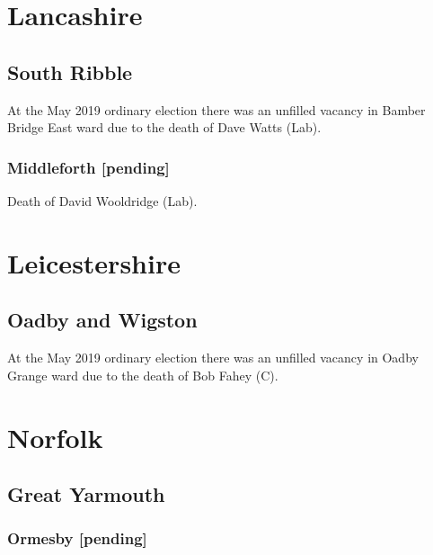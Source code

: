 \documentclass[a4paper,openany]{book}
\begin{document}
\begin{resultsiii}
\section{Lancashire}

\subsection*{South Ribble}

At the May 2019 ordinary election there was an unfilled vacancy in Bamber Bridge East ward due to the death of Dave Watts (Lab).

\subsubsection*{Middleforth \hspace*{\fill}\nolinebreak[1]%
	\enspace\hspace*{\fill}
	[pending]}


Death of David Wooldridge (Lab).

\section{Leicestershire}

\subsection*{Oadby and Wigston}

At the May 2019 ordinary election there was an unfilled vacancy in Oadby Grange ward due to the death of Bob Fahey (C).

\section{Norfolk}

\subsection*{Great Yarmouth}

\subsubsection*{Ormesby \hspace*{\fill}\nolinebreak[1]%
	\enspace\hspace*{\fill}
	[pending]}


\end{resultsiii}
\end{document}
